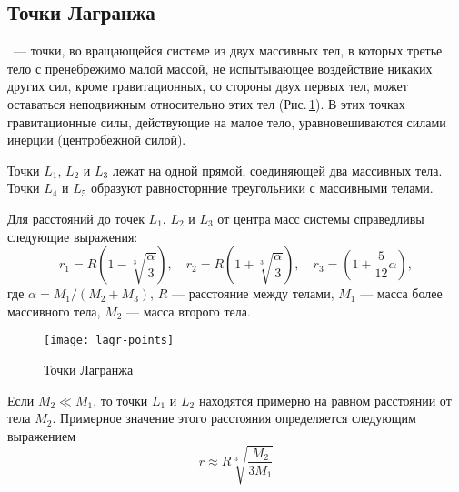 \subsection{Точки Лагранжа}

~--- точки, во вращающейся системе из двух
массивных тел, в которых третье тело с пренебрежимо 
малой массой, не испытывающее воздействие никаких 
других сил, кроме гравитационных, со стороны двух 
первых тел, может оставаться неподвижным относительно 
этих тел (Рис.\,\ref{pic:lagr-points}). В этих точках гравитационные силы, 
действующие на малое тело, уравновешиваются силами инерции (центробежной силой).

Точки $L_1$, $L_2$ и $L_3$ лежат на одной прямой, 
соединяющей два массивных тела. Точки $L_4$ и $L_5$ 
образуют равносторнние треугольники с массивными 
телами.

Для расстояний до точек $L_1$, $L_2$ и $L_3$ от 
центра масс системы справедливы следующие выражения:
\begin{equation}r_1=R\left(1-\sqrt[3]{\frac{\alpha}
{3}}\right), \quad r_2=R\left(1+\sqrt[3]{\frac{\alpha}
{3}}\right), \quad r_3=\left(1+\frac{5}{12}\alpha\right),
\end{equation}
где $\alpha=M_1/(M_2+M_3)$, $R$ --- расстояние между 
телами, $M_1$ --- масса более массивного тела, $M_2$
 --- масса второго тела.
\begin{figure}[h!]
\centering
\texttt{[image: lagr-points]}
\caption{Точки Лагранжа}\label{pic:lagr-points}
\end{figure}

Если $M_2\ll M_1$, то точки $L_1$ и $L_2$ находятся 
примерно на равном расстоянии от тела $M_2$. 
Примерное значение этого расстояния определяется следующим 
выражением\begin{equation}
r\approx R\sqrt[3]{\frac{M_2}{3M_1}}
\end{equation}
